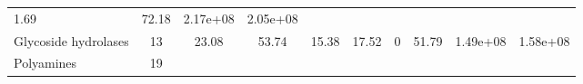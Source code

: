 \documentclass[]{article}
\begin{document}
\begin{longtable}[]{@{}lccccccccc@{}}
\begin{minipage}[t]{0.08\columnwidth}
1.69\strut
\end{minipage} & \begin{minipage}[t]{0.08\columnwidth}\centering\strut
72.18\strut
\end{minipage} & \begin{minipage}[t]{0.08\columnwidth}\centering\strut
2.17e+08\strut
\end{minipage} & \begin{minipage}[t]{0.08\columnwidth}\centering\strut
2.05e+08\strut
\end{minipage}\tabularnewline
\begin{minipage}[t]{0.07\columnwidth}\raggedright\strut
Glycoside hydrolases\strut
\end{minipage} & \begin{minipage}[t]{0.06\columnwidth}\centering\strut
13\strut
\end{minipage} & \begin{minipage}[t]{0.08\columnwidth}\centering\strut
23.08\strut
\end{minipage} & \begin{minipage}[t]{0.08\columnwidth}\centering\strut
53.74\strut
\end{minipage} & \begin{minipage}[t]{0.08\columnwidth}\centering\strut
15.38\strut
\end{minipage} & \begin{minipage}[t]{0.08\columnwidth}\centering\strut
17.52\strut
\end{minipage} & \begin{minipage}[t]{0.08\columnwidth}\centering\strut
0\strut
\end{minipage} & \begin{minipage}[t]{0.08\columnwidth}\centering\strut
51.79\strut
\end{minipage} & \begin{minipage}[t]{0.08\columnwidth}\centering\strut
1.49e+08\strut
\end{minipage} & \begin{minipage}[t]{0.08\columnwidth}\centering\strut
1.58e+08\strut
\end{minipage}\tabularnewline
\begin{minipage}[t]{0.07\columnwidth}\raggedright\strut
Polyamines\strut
\end{minipage} & \begin{minipage}[t]{0.06\columnwidth}\centering\strut
19\strut
\end{minipage} & \begin{minipage}[t]{0.08\columnwidth}\centering\strut

\end{minipage}
\end{longtable}
\end{document}
